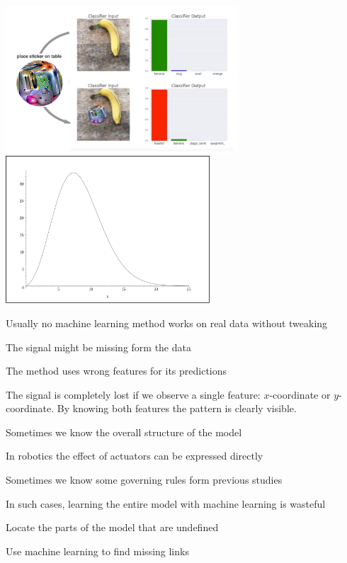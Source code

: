 \documentclass[landscape,footrule]{foils}
\begin{document}
\begin{tabbing}
   \> \includegraphics[height = 5.5cm]{adversarial-learning}
   \> \includegraphics[height = 5.5cm, trim=-4.5cm 0cm -4.5cm 0cm, clip]{curse-of-dimensions}
\end{tabbing}





Usually no machine learning method works on real data without tweaking 
\begin{triangles}
 \item The signal might be missing form the data 
 \item The method uses wrong features for its predictions 
\end{triangles}




The signal is completely lost if we observe a single feature: $x$-coordinate or $y$-coordinate. By knowing both features the pattern is clearly visible.




Sometimes we know the overall structure of the model
\begin{triangles}
 \item In robotics the effect of actuators can be expressed directly
 \item Sometimes we know some governing rules form previous studies
\end{triangles} 
In such cases, learning the entire model with machine learning is wasteful
\begin{triangles}
 \item Locate the parts of the model that are undefined
 \item Use machine learning to find missing links 
\end{triangles} 
\end{document}
